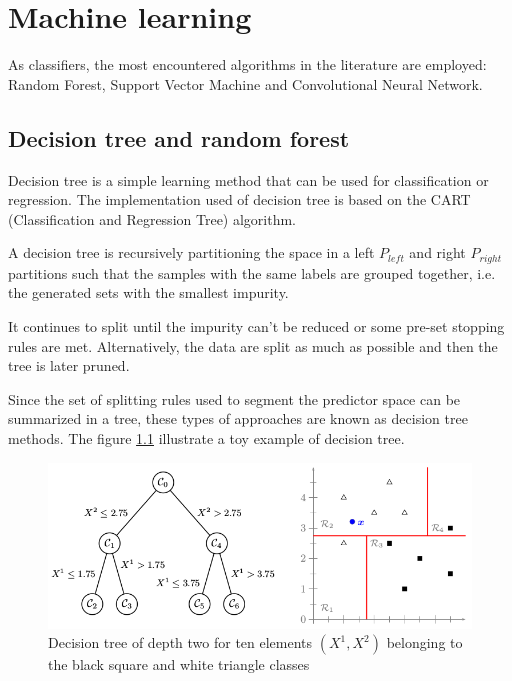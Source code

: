 \chapter{Machine learning}  \label{sec:classifier}

As classifiers, the most encountered algorithms in the literature are employed: Random Forest, Support Vector Machine and Convolutional Neural Network.

\section{Decision tree and random forest}

Decision tree is a simple learning method that can be used for classification or regression. The implementation used of decision tree is based on the CART (Classification and Regression Tree) algorithm.

A decision tree is recursively partitioning the space in a left $P_{left}$ and right $P_{right}$ partitions such that the samples with the same labels are grouped together, i.e. the generated sets with the smallest impurity.

It continues to split until the impurity can't be reduced or some pre-set stopping rules are met. Alternatively, the data are split as much as possible and then the tree is later pruned.

Since the set of splitting rules used to segment the predictor space can be summarized in a tree, these types of approaches are known as decision tree methods. The figure  \ref{fig:decision_tree_simple_example} illustrate a toy example of decision tree.

\begin{figure}[h]
    \includegraphics[scale=0.5]{img/decision_tree_simple_example}
    \caption[Decision tree of for ten elements belonging to two classes]{Decision tree of depth two for ten elements $(X^1, X^2)$ belonging to the black square and white triangle classes}
    \label{fig:decision_tree_simple_example}
\end{figure}

